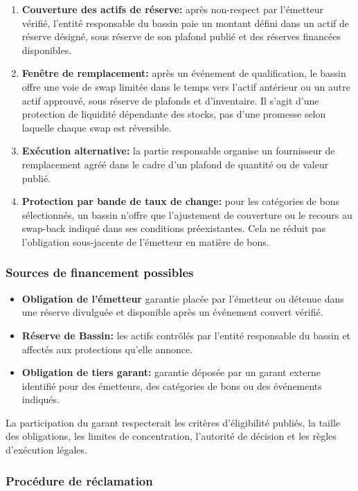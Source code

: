 \documentclass[11pt]{article}
\begin{document}
\begin{enumerate}[leftmargin=*]
\item \textbf{Couverture des actifs de réserve:} après non-respect par l'émetteur vérifié, l'entité responsable du bassin paie un montant défini dans un actif de réserve désigné, sous réserve de son plafond publié et des réserves financées disponibles.
\item \textbf{Fenêtre de remplacement:} après un événement de qualification, le bassin offre une voie de swap limitée dans le temps vers l'actif antérieur ou un autre actif approuvé, sous réserve de plafonds et d'inventaire. Il s'agit d'une protection de liquidité dépendante des stocks, pas d'une promesse selon laquelle chaque swap est réversible.
\item \textbf{Exécution alternative:} la partie responsable organise un fournisseur de remplacement agréé dans le cadre d'un plafond de quantité ou de valeur publié.
\item \textbf{Protection par bande de taux de change:} pour les catégories de bons sélectionnés, un bassin n'offre que l'ajustement de couverture ou le recours au swap-back indiqué dans ses conditions préexistantes. Cela ne réduit pas l'obligation sous-jacente de l'émetteur en matière de bons.
\end{enumerate}
\subsubsection*{Sources de financement possibles}

\begin{itemize}[leftmargin=*]
\item \textbf{Obligation de l'émetteur} garantie placée par l'émetteur ou détenue dans une réserve divulguée et disponible après un événement couvert vérifié.
\item \textbf{Réserve de Bassin:} les actifs contrôlés par l'entité responsable du bassin et affectés aux protections qu'elle annonce.
\item \textbf{Obligation de tiers garant:} garantie déposée par un garant externe identifié pour des émetteurs, des catégories de bons ou des événements indiqués.
\end{itemize}
La participation du garant respecterait les critères d'éligibilité publiés, la taille des obligations, les limites de concentration, l'autorité de décision et les règles d'exécution légales.

\subsubsection*{Procédure de réclamation}
\end{document}
